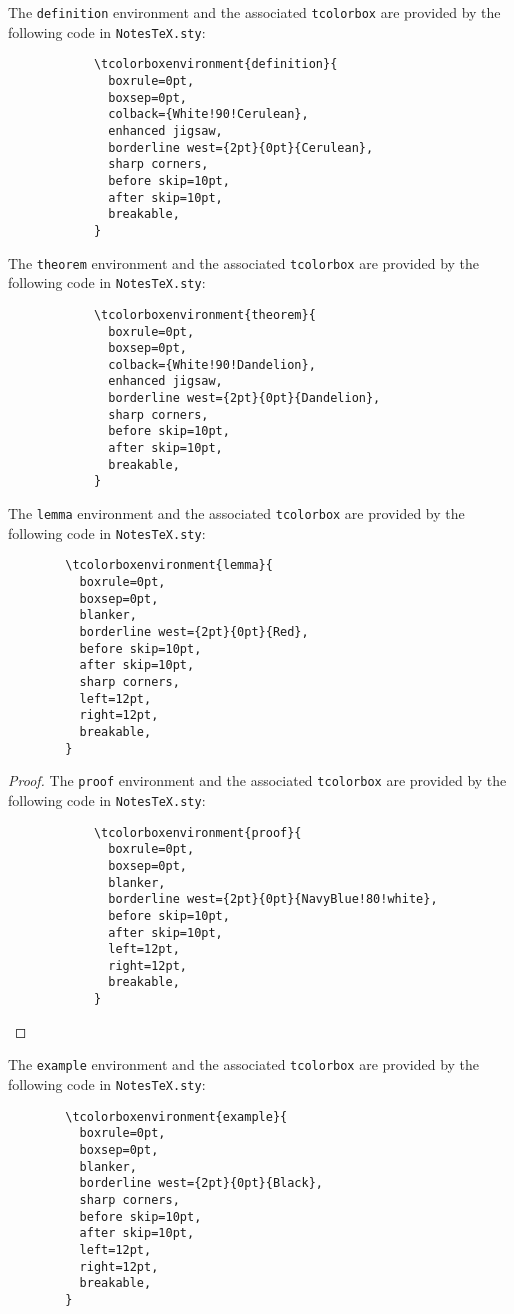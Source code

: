 \documentclass[10pt]{article}
\begin{document}
\begin{definition}
	The \texttt{definition} environment and the associated \texttt{tcolorbox} are provided by the following code in \texttt{NotesTeX.sty}:
	\begin{verbatim}
			\tcolorboxenvironment{definition}{
			  boxrule=0pt,
			  boxsep=0pt,
			  colback={White!90!Cerulean},
			  enhanced jigsaw, 
			  borderline west={2pt}{0pt}{Cerulean},
			  sharp corners,
			  before skip=10pt,
			  after skip=10pt,
			  breakable,
			}
		\end{verbatim}
\end{definition}
\begin{theorem}
	The \texttt{theorem} environment and the associated \texttt{tcolorbox} are provided by the following code in \texttt{NotesTeX.sty}:
	\begin{verbatim}
			\tcolorboxenvironment{theorem}{
			  boxrule=0pt,
			  boxsep=0pt,
			  colback={White!90!Dandelion},
			  enhanced jigsaw, 
			  borderline west={2pt}{0pt}{Dandelion},
			  sharp corners,
			  before skip=10pt,
			  after skip=10pt,
			  breakable,
			}
		\end{verbatim}
\end{theorem}
\begin{lemma}
	The \texttt{lemma} environment and the associated \texttt{tcolorbox} are provided by the following code in \texttt{NotesTeX.sty}:
	\begin{verbatim}
		\tcolorboxenvironment{lemma}{
		  boxrule=0pt,
		  boxsep=0pt,
		  blanker,
		  borderline west={2pt}{0pt}{Red},
		  before skip=10pt,
		  after skip=10pt,
		  sharp corners,
		  left=12pt,
		  right=12pt,
		  breakable,
		}
		\end{verbatim}
\end{lemma}
\begin{proof}
	The \texttt{proof} environment and the associated \texttt{tcolorbox} are provided by the following code in \texttt{NotesTeX.sty}:
	\begin{verbatim}
			\tcolorboxenvironment{proof}{
			  boxrule=0pt,
			  boxsep=0pt,
			  blanker,
			  borderline west={2pt}{0pt}{NavyBlue!80!white},
			  before skip=10pt,
			  after skip=10pt,
			  left=12pt,
			  right=12pt,
			  breakable,
			}
		\end{verbatim}
\end{proof}
\begin{example}
	The \texttt{example} environment and the associated \texttt{tcolorbox} are provided by the following code in \texttt{NotesTeX.sty}:
	\begin{verbatim}	
		\tcolorboxenvironment{example}{
		  boxrule=0pt,
		  boxsep=0pt,
		  blanker,
		  borderline west={2pt}{0pt}{Black},
		  sharp corners,
		  before skip=10pt,
		  after skip=10pt,
		  left=12pt,
		  right=12pt,
		  breakable,
		}
		\end{verbatim}
\end{example}
\end{document}
